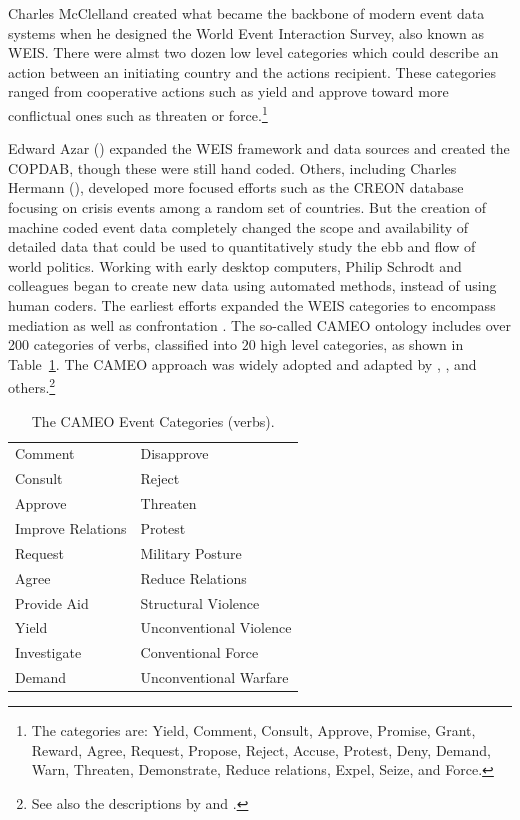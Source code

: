 \documentclass[12pt,oneside,doublespace,pdflatex]{amsart}
\begin{document}
Charles McClelland \citep{mcclelland:hoggard:1969} created what became the backbone of modern event data systems when he designed the World Event Interaction Survey, also known as WEIS. There were almst two dozen 
low level categories which could describe an action between an initiating country and the actions recipient. These categories
ranged from cooperative actions such as yield and approve toward more conflictual ones such as threaten or force.\footnote{The categories are: 
Yield,
Comment,
Consult,
Approve,
Promise,
Grant,
Reward,
Agree,
Request,
Propose,
Reject,
Accuse,
Protest,
Deny,
Demand,
Warn,
Threaten,
Demonstrate,
Reduce relations,
Expel,
Seize, and
Force. }

Edward Azar (\citeyear{azar:1980}) expanded the WEIS framework and data sources and created the COPDAB, though these were still hand coded. Others, including 
Charles Hermann (\citeyear{hermann:etal:1973}), developed more focused efforts such as the
CREON database focusing on crisis events among a random set of countries.
But the creation of machine coded event data completely changed the scope and availability of detailed data that could
be used to quantitatively study the ebb and flow of world politics.  Working with early desktop computers, Philip Schrodt and colleagues began to create new data using automated methods, instead of using human coders. The earliest efforts expanded the WEIS categories to encompass mediation as well as confrontation \citep{schrodt:1994,gerner:etal:1994,schrodt:1997,gerner:schrodt:yilmaz:abujabr:2002}.
The so-called CAMEO ontology includes over 200 categories of verbs, classified into $20$ high level categories, as shown
in Table~\ref{tab:cameo}. The CAMEO approach was widely adopted and adapted by 
\citet{bond:etal:2003},
\citet{king:lowe:2003}, and others.\footnote{See also the descriptions by
\citet{schrodt:vanbrackle:2013} and \citet{
schrodt:2013}.}

\begin{table}
\caption{The CAMEO Event Categories (verbs). \label{tab:cameo}}
\begin{center}
\begin{tabular}{ll}
Comment & Disapprove \\
Consult & Reject \\
Approve & Threaten \\
Improve Relations& Protest \\
Request & Military Posture \\
Agree & Reduce Relations \\
Provide Aid & Structural Violence \\
Yield & Unconventional Violence \\
Investigate & Conventional Force \\
Demand & Unconventional Warfare \\
\end{tabular}
\end{center}
\end{table}
\end{document}
